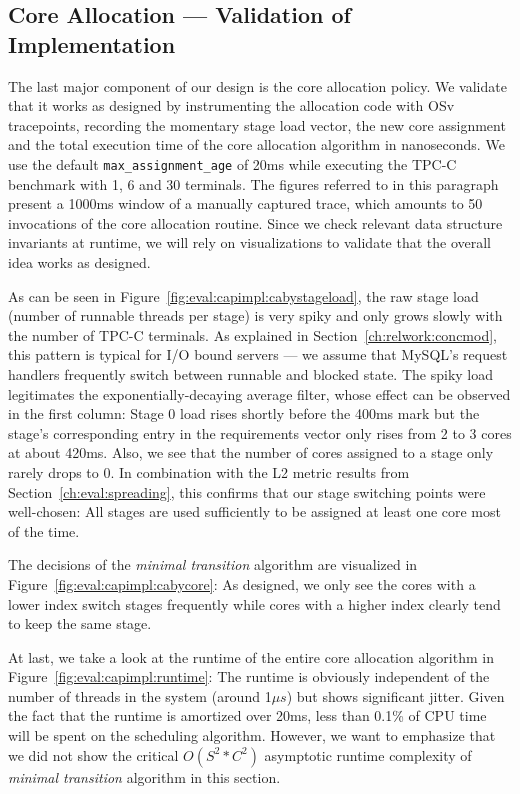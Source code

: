 \documentclass[12pt,a4paper]{book}
\begin{document}
\clearpage
\subsection{Core Allocation --- Validation of Implementation}\label{ch:eval:polidea}

The last major component of our design is the core allocation policy.
We validate that it works as designed by instrumenting the allocation code with OSv tracepoints, recording the momentary stage load vector, the new core assignment and the total execution time of the core allocation algorithm in nanoseconds.
We use the default \lstinline[style=figurecpp]{max_assignment_age} of 20ms while executing the TPC-C benchmark with 1, 6 and 30 terminals.
The figures referred to in this paragraph present a 1000ms window of a manually captured trace, which amounts to 50 invocations of the core allocation routine.
Since we check relevant data structure invariants at runtime, we will rely on visualizations to validate that the overall idea works as designed.

As can be seen in Figure~\ref{fig:eval:capimpl:cabystageload}, the raw stage load (number of runnable threads per stage) is very spiky and only grows slowly with the number of TPC-C terminals.
As explained in Section~\ref{ch:relwork:concmod}, this pattern is typical for I/O bound servers  --- we assume that MySQL's request handlers frequently switch between runnable and blocked state.
The spiky load legitimates the exponentially-decaying average filter, whose effect can be observed in the first column:
Stage 0 load rises shortly before the 400ms mark but the stage's corresponding entry in the requirements vector only rises from 2 to 3 cores at about 420ms.
Also, we see that the number of cores assigned to a stage only rarely drops to 0.
In combination with the L2 metric results from Section~\ref{ch:eval:spreading}, this confirms that our stage switching points were well-chosen:
All stages are used sufficiently to be assigned at least one core most of the time.

The decisions of the \emph{minimal transition} algorithm are visualized in Figure~\ref{fig:eval:capimpl:cabycore}:
As designed, we only see the cores with a lower index switch stages frequently while cores with a higher index clearly tend to keep the same stage.

At last, we take a look at the runtime of the entire core allocation algorithm in Figure~\ref{fig:eval:capimpl:runtime}:
The runtime is obviously independent of the number of threads in the system (around 1$\mu s$) but shows significant jitter.
Given the fact that the runtime is amortized over 20ms, less than 0.1\% of CPU time will be spent on the scheduling algorithm.
However, we want to emphasize that we did not show the critical $O(S^2 * C^2)$ asymptotic runtime complexity of \emph{minimal transition} algorithm in this section.
\end{document}
